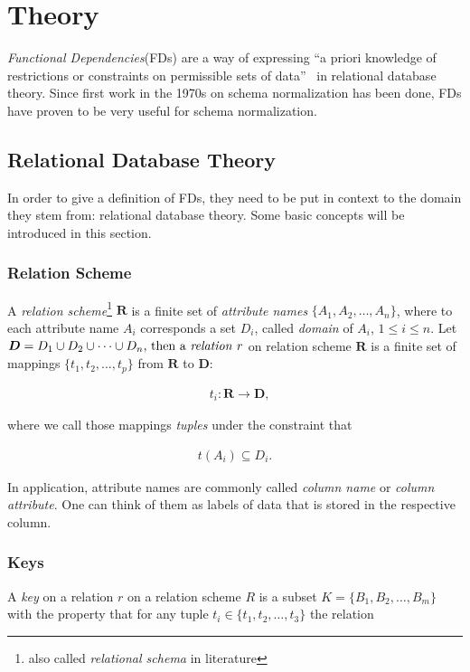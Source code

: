 \newpage
\section{Theory}
\emph{Functional Dependencies}(FDs) are a way of expressing ``a priori knowledge of restrictions or constraints on permissible sets of data''~\cite[p.~42]{MAI83} in relational database theory.
Since first work in the 1970s on schema normalization has been done, FDs have proven to be very useful for schema normalization.


\subsection{Relational Database Theory}
In order to give a definition of FDs, they need to be put in context to the domain they stem from: relational database theory. Some basic concepts will be introduced in this section.


\subsubsection{Relation Scheme}
A \emph{relation scheme}\footnote{also called \emph{relational schema} in literature\cite[p.21]{ABE19} } \(\boldsymbol{R}\) is a finite set of \emph{attribute names} \(\{A_1, A_2, \dots, A_n\}\), where to each attribute name \(A_i\) corresponds a set \(D_i\), called \emph{domain} of \(A_i\), \(1 \leq i \leq n\).
Let \(\boldsymbol{D} = D_1 \cup D_2 \cup \dots \cup D_n$, then a \emph{relation} \(r\) on relation scheme \(\boldsymbol{R}\) is a finite set of mappings \(\{t_1, t_2, \dots, t_p\}\) from \(\boldsymbol{R}\) to \(\boldsymbol{D}\):

\begin{align*}
  &t_i: \boldsymbol{R} \to \boldsymbol{D},
\end{align*}

where we call those mappings \emph{tuples} under the constraint that~\cite[p.2]{MAI83}

\begin{align*}
    t(A_i) \subseteq D_i.
\end{align*}

In application, attribute names are commonly called \emph{column name} or \emph{column attribute}.
One can think of them as labels of data that is stored in the respective column.


\subsubsection{Keys}
A \emph{key} on a relation \( r \) on a relation scheme \( R \) is a subset \( K = \{ B_1, B_2, \dots, B_m \} \) with the property that for any tuple \( t_i \in \{ t_1, t_2, \dots, t_3 \} \) the relation

